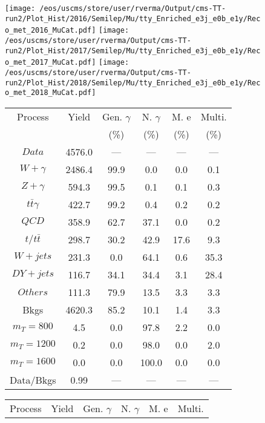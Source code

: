 \begin{figure}
\centering
\texttt{[image: /eos/uscms/store/user/rverma/Output/cms-TT-run2/Plot\_Hist/2016/Semilep/Mu/tty\_Enriched\_e3j\_e0b\_e1y/Reco\_met\_2016\_MuCat.pdf]}
\texttt{[image: /eos/uscms/store/user/rverma/Output/cms-TT-run2/Plot\_Hist/2017/Semilep/Mu/tty\_Enriched\_e3j\_e0b\_e1y/Reco\_met\_2017\_MuCat.pdf]}
\texttt{[image: /eos/uscms/store/user/rverma/Output/cms-TT-run2/Plot\_Hist/2018/Semilep/Mu/tty\_Enriched\_e3j\_e0b\_e1y/Reco\_met\_2018\_MuCat.pdf]}
\begin{minipage}[c]{0.32\textwidth}
\centering
\tiny{
\begin{tabular}{cccccc}
\hline
Process & Yield & Gen. $\gamma$ & N. $\gamma$ & M. e & Multi. \\
 &  & (\%) & (\%) & (\%) & (\%)  \\
\hline
                                                                      $ Data $ &  4576.0 &  --- &  --- &  --- &  ---\\
$ W+\gamma $ &  2486.4 &  99.9 &  0.0 &  0.0 &  0.1\\
$ Z+\gamma $ &  594.3 &  99.5 &  0.1 &  0.1 &  0.3\\
$ t\bar{t}\gamma $ &  422.7 &  99.2 &  0.4 &  0.2 &  0.2\\
$ QCD $ &  358.9 &  62.7 &  37.1 &  0.0 &  0.2\\
$ t/t\bar{t} $ &  298.7 &  30.2 &  42.9 &  17.6 &  9.3\\
$ W+jets $ &  231.3 &  0.0 &  64.1 &  0.6 &  35.3\\
$ DY+jets $ &  116.7 &  34.1 &  34.4 &  3.1 &  28.4\\
$ Others $ &  111.3 &  79.9 &  13.5 &  3.3 &  3.3\\
Bkgs &  4620.3 &  85.2 &  10.1 &  1.4 &  3.3\\
$ m_{T} = 800 $ &  4.5 &  0.0 &  97.8 &  2.2 &  0.0\\
$ m_{T} = 1200 $ &  0.2 &  0.0 &  98.0 &  0.0 &  2.0\\
$ m_{T} = 1600 $ &  0.0 &  0.0 &  100.0 &  0.0 &  0.0\\
Data/Bkgs &  0.99 &  --- &  --- &  --- &  ---\\
\hline
\end{tabular}
}
\end{minipage}
\begin{minipage}[c]{0.32\textwidth}
\centering
\tiny{
\begin{tabular}{cccccc}
\hline
Process & Yield & Gen. $\gamma$ & N. $\gamma$ & M. e & Multi. \\

\end{tabular}}
\end{minipage}
\end{figure}
